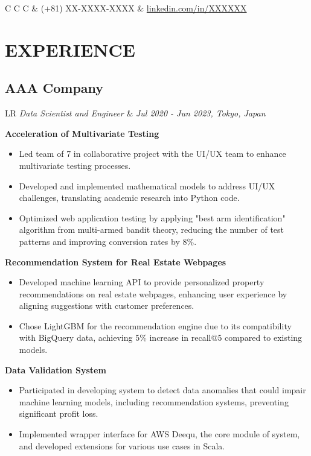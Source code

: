 \documentclass[11pt,a4paper]{moderncv}
\newcommand*{\experienceentry}[5][1.5mm]{
    \subsection{#2} \vspace{-1.5mm}
    \begin{tabularx}{\textwidth}{LR}
        {\itshape #3} & {\itshape #4, #5}
    \end{tabularx}
    \par\addvspace{#1}
}
\begin{document}
\maketitle
\vspace{-9.0mm}
\begin{tabularx}{\textwidth}{C C C}
    \emailsymbol\enspace {} & \mobilephonesymbol\enspace (+81) XX-XXXX-XXXX & \faLinkedin\enspace \href{https://www.linkedin.com/in/XXXXXX/}{linkedin.com/in/XXXXXX}
\end{tabularx}
\vspace{-2.0mm}

\begin{minipage}[t]{0.62\textwidth}
\section{EXPERIENCE}
\experienceentry{AAA Company}{Data Scientist and Engineer}{Jul 2020 - Jun 2023}{Tokyo, Japan}

\textbf{Acceleration of Multivariate Testing}
\begin{itemize}
    \item Led team of 7 in collaborative project with the UI/UX team to enhance multivariate testing processes.
    \item Developed and implemented mathematical models to address UI/UX challenges, translating academic research into Python code.
    \item Optimized web application testing by applying "best arm identification" algorithm from multi-armed bandit theory, reducing the number of test patterns and improving conversion rates by 8\%.
\end{itemize}
\vspace{1.0mm}

\textbf{Recommendation System for Real Estate Webpages}
\begin{itemize}
    \item Developed machine learning API to provide personalized property recommendations on real estate webpages, enhancing user experience by aligning suggestions with customer preferences.
    \item Chose LightGBM for the recommendation engine due to its compatibility with BigQuery data, achieving 5\% increase in recall@5 compared to existing models.
\end{itemize}
\vspace{1.0mm}

\textbf{Data Validation System}
\begin{itemize}
    \item Participated in developing system to detect data anomalies that could impair machine learning models, including recommendation systems, preventing significant profit loss.
    \item Implemented wrapper interface for AWS Deequ, the core module of system, and developed extensions for various use cases in Scala.
\end{itemize}
\vspace{2.0mm}


\end{minipage}
\end{document}
